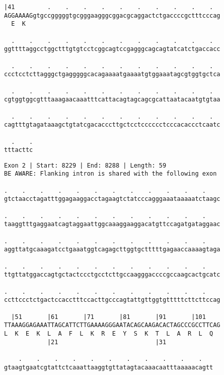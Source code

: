 \documentclass{article}
\begin{document}
\begin{Verbatim}
|41         .    .    .    .    .    .    .    .    .    .  
AGGAAAAGgtgccgggggtgcgggaagggcggacgcaggactctgaccccgctttcccag
  E  K                                                      
  
  .    .    .    .    .    .    .    .    .    .    .    .  
ggttttaggcctggctttgtgtcctcggcagtccgagggcagcagtatcatctgaccacc
  
  .    .    .    .    .    .    .    .    .    .    .    .  
ccctcctcttagggctgagggggcacagaaaatgaaaatgtggaaatagcgtggtgctca
  
  .    .    .    .    .    .    .    .    .    .    .    .  
cgtggtggcgtttaaagaacaaatttcattacagtagcagcgcattaatacaatgtgtaa
  
  .    .    .    .    .    .    .    .    .    .    .    .  
cagtttgtagataaagctgtatcgacacccttgctcctcccccctcccacaccctcaatc
  
  .    .
tttacttc
\end{Verbatim}
\newpage
\begin{Verbatim}
Exon 2 | Start: 8229 | End: 8288 | Length: 59
BE AWARE: Flanking intron is shared with the following exon
 
.    .    .    .    .    .    .    .    .    .    .    .    
gtctaacctagatttggagaaggacctagaagtctatcccagggaaataaaaatctaagc
  
.    .    .    .    .    .    .    .    .    .    .    .    
taaggtttgaggaatcagtaggaattggcaaaggaaggacatgttccagatgataggaac
  
.    .    .    .    .    .    .    .    .    .    .    .    
aggttatgcaaagatcctgaaatggtcagagcttggtgctttttgagaaccaaaagtaga
  
.    .    .    .    .    .    .    .    .    .    .    .    
ttgttatggaccagtgctactccctgcctcttgccaagggaccccgccaagcactgcatc
  
.    .    .    .    .    .    .    .    .    .    .    .    
ccttccctctgactccacctttccacttgcccagtattgttggtgtttttcttcttccag
  
  |51       |61       |71       |81       |91       |101    
TTAAAGGAGAAATTAGCATTCTTGAAAAGGGAATACAGCAAGACACTAGCCCGCCTTCAG
L  K  E  K  L  A  F  L  K  R  E  Y  S  K  T  L  A  R  L  Q  
            |21                           |31               
  
    .    .    .    .    .    .    .    .    .    .    .   
gtaagtgaatcgtattctcaaattaaggtgttatagtacaaacaatttaaaaacagtt
\end{Verbatim}
\newpage
\end{document}
